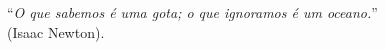 \begin{epigrafe} 
	``\textit{O que sabemos é uma gota; o que ignoramos é um oceano.}''\\
	(Isaac Newton).
\end{epigrafe}
